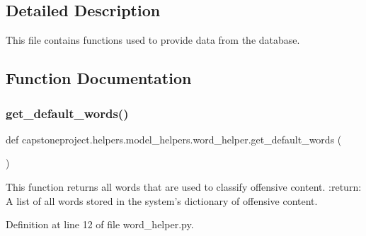 \subsection{Detailed Description}
\begin{DoxyVerb}This file contains functions used to provide data from the database.
\end{DoxyVerb}
 

\subsection{Function Documentation}
\mbox{\label{namespacecapstoneproject_1_1helpers_1_1model__helpers_1_1word__helper_a973e709c58f456c247d624506934abbe}} 
\subsubsection{\texorpdfstring{get\+\_\+default\+\_\+words()}{get\_default\_words()}}
{\footnotesize\ttfamily def capstoneproject.\+helpers.\+model\+\_\+helpers.\+word\+\_\+helper.\+get\+\_\+default\+\_\+words (\begin{DoxyParamCaption}{ }\end{DoxyParamCaption})}

\begin{DoxyVerb}This function returns all words that are used to
classify offensive content.
:return: A list of all words stored in the system's
dictionary of offensive content.
\end{DoxyVerb}
 

Definition at line 12 of file word\+\_\+helper.\+py.

